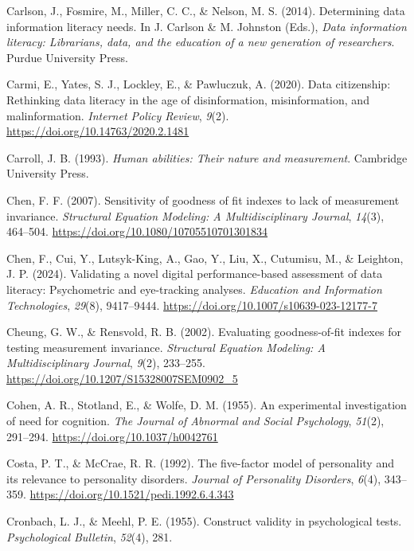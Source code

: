 \documentclass[
  12pt,
  a4paper,
  twoside]{article}
\newlength{\cslhangindent}
\newenvironment{CSLReferences}[2] %
 {\begin{list}{}{%
  \setlength{\itemindent}{0pt}
  \setlength{\leftmargin}{0pt}
  \setlength{\parsep}{0pt}
  \ifodd #1
   \setlength{\leftmargin}{\cslhangindent}
   \setlength{\itemindent}{-1\cslhangindent}
  \fi
  \setlength{\itemsep}{#2\baselineskip}}}
 {\end{list}}
\begin{document}
\begin{CSLReferences}{1}{0}
Carlson, J., Fosmire, M., Miller, C. C., \& Nelson, M. S. (2014). Determining data information literacy needs. In J. Carlson \& M. Johnston (Eds.), \emph{Data information literacy: Librarians, data, and the education of a new generation of researchers}. Purdue University Press.

Carmi, E., Yates, S. J., Lockley, E., \& Pawluczuk, A. (2020). Data citizenship: Rethinking data literacy in the age of disinformation, misinformation, and malinformation. \emph{Internet Policy Review}, \emph{9}(2). \url{https://doi.org/10.14763/2020.2.1481}

Carroll, J. B. (1993). \emph{Human abilities: Their nature and measurement}. Cambridge University Press.

Chen, F. F. (2007). Sensitivity of goodness of fit indexes to lack of measurement invariance. \emph{Structural Equation Modeling: A Multidisciplinary Journal}, \emph{14}(3), 464--504. \url{https://doi.org/10.1080/10705510701301834}

Chen, F., Cui, Y., Lutsyk-King, A., Gao, Y., Liu, X., Cutumisu, M., \& Leighton, J. P. (2024). Validating a novel digital performance-based assessment of data literacy: Psychometric and eye-tracking analyses. \emph{Education and Information Technologies}, \emph{29}(8), 9417--9444. \url{https://doi.org/10.1007/s10639-023-12177-7}

Cheung, G. W., \& Rensvold, R. B. (2002). Evaluating goodness-of-fit indexes for testing measurement invariance. \emph{Structural Equation Modeling: A Multidisciplinary Journal}, \emph{9}(2), 233--255. \url{https://doi.org/10.1207/S15328007SEM0902_5}

Cohen, A. R., Stotland, E., \& Wolfe, D. M. (1955). An experimental investigation of need for cognition. \emph{The Journal of Abnormal and Social Psychology}, \emph{51}(2), 291--294. \url{https://doi.org/10.1037/h0042761}

Costa, P. T., \& McCrae, R. R. (1992). The five-factor model of personality and its relevance to personality disorders. \emph{Journal of Personality Disorders}, \emph{6}(4), 343--359. \url{https://doi.org/10.1521/pedi.1992.6.4.343}

Cronbach, L. J., \& Meehl, P. E. (1955). Construct validity in psychological tests. \emph{Psychological Bulletin}, \emph{52}(4), 281.


\end{CSLReferences}
\end{document}
